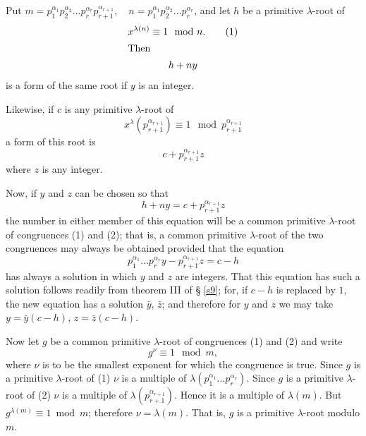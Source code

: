 \documentclass[oneside]{book}
\begin{document}
Put $m = p_1^{\alpha_1} p_2^{\alpha_2} \ldots p_r^{\alpha_r}
p_{r+1}^{\alpha_{r+1}}, \quad n = p_1^{\alpha_1} p_2^{\alpha_2}
\ldots p_r^{\alpha_r}$, and let $h$ be a primitive $\lambda$-root of
\begin{gather}
x^{\lambda(n)} \equiv 1 \mod n. \tag{1} \\
\intertext{Then}
h + ny \notag
\end{gather}
is a form of the same root if $y$ is an integer.

Likewise, if $c$ is any primitive $\lambda$-root of
\begin{equation}
x^\lambda(p_{r+1}^{\alpha_{r+1}})
   \equiv 1 \mod p_{r+1}^{\alpha_{r+1}} \tag{2}
\end{equation}
a form of this root is
\begin{equation*}
c+p_{r+1}^{\alpha_{r+1}}z
\end{equation*}
where $z$ is any integer.

Now, if $y$ and $z$ can be chosen so that
\begin{equation*}
h+ny = c+p_{r+1}^{\alpha_{r+1}}z
\end{equation*}
the number in either member of this equation will be a common
primitive $\lambda$-root of congruences (1) and (2); that is, a
common primitive $\lambda$-root of the two congruences may always be
obtained provided that the equation
\begin{equation*}
p_1^{\alpha_1} \ldots p_r^{\alpha_r}y - p_{r+1}^{\alpha_{r+1}}z = c-h
\end{equation*}
has always a solution in which $y$ and $z$ are integers. That this
equation has such a solution follows readily from theorem III of \S
\ref{s9}; for, if $c-h$ is replaced by $1$, the new equation has a
solution $\bar{y}$, $\bar{z}$; and therefore for $y$ and $z$ we may
take $y = \bar{y}(c-h)$, $z = \bar{z}(c-h)$.

Now let $g$ be a common primitive $\lambda$-root of congruences (1)
and (2) and write
\begin{equation*}
g^\nu \equiv 1 \mod m,
\end{equation*}
where $\nu$ is to be the smallest exponent for which the congruence
is true. Since $g$ is a primitive $\lambda$-root of (1) $\nu$ is a
multiple of $\lambda(p_1^{\alpha_1} \ldots p_r^{\alpha_r})$. Since
$g$ is a primitive $\lambda$-root of (2) $\nu$ is a multiple of
$\lambda\left(p_{r+1}^{\alpha_{r+1}} \right)$. Hence it is a
multiple of $\lambda(m)$. But $g^{\lambda(m)} \equiv 1 \bmod m$;
therefore $\nu = \lambda(m)$. That is, $g$ is a primitive
$\lambda$-root modulo $m$.
\end{document}
